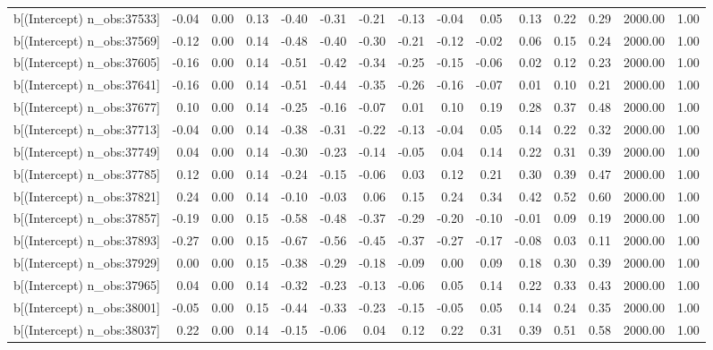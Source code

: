 \begin{table}[ht]
\begin{tabular}{rrrrrrrrrrrrrrr}
  b[(Intercept) n\_obs:37533] & -0.04 & 0.00 & 0.13 & -0.40 & -0.31 & -0.21 & -0.13 & -0.04 & 0.05 & 0.13 & 0.22 & 0.29 & 2000.00 & 1.00 \\ 
  b[(Intercept) n\_obs:37569] & -0.12 & 0.00 & 0.14 & -0.48 & -0.40 & -0.30 & -0.21 & -0.12 & -0.02 & 0.06 & 0.15 & 0.24 & 2000.00 & 1.00 \\ 
  b[(Intercept) n\_obs:37605] & -0.16 & 0.00 & 0.14 & -0.51 & -0.42 & -0.34 & -0.25 & -0.15 & -0.06 & 0.02 & 0.12 & 0.23 & 2000.00 & 1.00 \\ 
  b[(Intercept) n\_obs:37641] & -0.16 & 0.00 & 0.14 & -0.51 & -0.44 & -0.35 & -0.26 & -0.16 & -0.07 & 0.01 & 0.10 & 0.21 & 2000.00 & 1.00 \\ 
  b[(Intercept) n\_obs:37677] & 0.10 & 0.00 & 0.14 & -0.25 & -0.16 & -0.07 & 0.01 & 0.10 & 0.19 & 0.28 & 0.37 & 0.48 & 2000.00 & 1.00 \\ 
  b[(Intercept) n\_obs:37713] & -0.04 & 0.00 & 0.14 & -0.38 & -0.31 & -0.22 & -0.13 & -0.04 & 0.05 & 0.14 & 0.22 & 0.32 & 2000.00 & 1.00 \\ 
  b[(Intercept) n\_obs:37749] & 0.04 & 0.00 & 0.14 & -0.30 & -0.23 & -0.14 & -0.05 & 0.04 & 0.14 & 0.22 & 0.31 & 0.39 & 2000.00 & 1.00 \\ 
  b[(Intercept) n\_obs:37785] & 0.12 & 0.00 & 0.14 & -0.24 & -0.15 & -0.06 & 0.03 & 0.12 & 0.21 & 0.30 & 0.39 & 0.47 & 2000.00 & 1.00 \\ 
  b[(Intercept) n\_obs:37821] & 0.24 & 0.00 & 0.14 & -0.10 & -0.03 & 0.06 & 0.15 & 0.24 & 0.34 & 0.42 & 0.52 & 0.60 & 2000.00 & 1.00 \\ 
  b[(Intercept) n\_obs:37857] & -0.19 & 0.00 & 0.15 & -0.58 & -0.48 & -0.37 & -0.29 & -0.20 & -0.10 & -0.01 & 0.09 & 0.19 & 2000.00 & 1.00 \\ 
  b[(Intercept) n\_obs:37893] & -0.27 & 0.00 & 0.15 & -0.67 & -0.56 & -0.45 & -0.37 & -0.27 & -0.17 & -0.08 & 0.03 & 0.11 & 2000.00 & 1.00 \\ 
  b[(Intercept) n\_obs:37929] & 0.00 & 0.00 & 0.15 & -0.38 & -0.29 & -0.18 & -0.09 & 0.00 & 0.09 & 0.18 & 0.30 & 0.39 & 2000.00 & 1.00 \\ 
  b[(Intercept) n\_obs:37965] & 0.04 & 0.00 & 0.14 & -0.32 & -0.23 & -0.13 & -0.06 & 0.05 & 0.14 & 0.22 & 0.33 & 0.43 & 2000.00 & 1.00 \\ 
  b[(Intercept) n\_obs:38001] & -0.05 & 0.00 & 0.15 & -0.44 & -0.33 & -0.23 & -0.15 & -0.05 & 0.05 & 0.14 & 0.24 & 0.35 & 2000.00 & 1.00 \\ 
  b[(Intercept) n\_obs:38037] & 0.22 & 0.00 & 0.14 & -0.15 & -0.06 & 0.04 & 0.12 & 0.22 & 0.31 & 0.39 & 0.51 & 0.58 & 2000.00 & 1.00 \\ 

\end{tabular}
\end{table}
